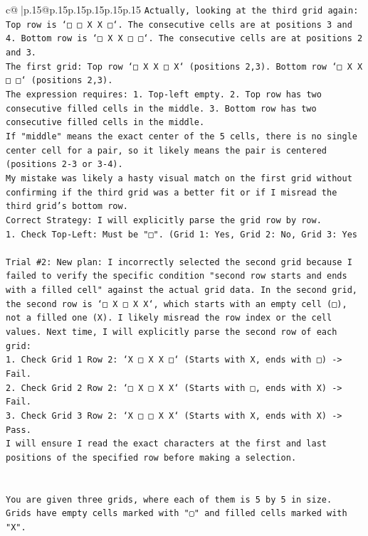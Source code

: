 \documentclass{article}
\begin{document}
{\begin{supertabular}{c@{$\;$}|p{.15\linewidth}@{}p{.15\linewidth}p{.15\linewidth}p{.15\linewidth}p{.15\linewidth}p{.15\linewidth}}
{{{\texttt{Actually, looking at the third grid again: Top row is `□ □ X X □`. The consecutive cells are at positions 3 and 4. Bottom row is `□ X X □ □`. The consecutive cells are at positions 2 and 3.} \\
\texttt{The first grid: Top row `□ X X □ X` (positions 2,3). Bottom row `□ X X □ □` (positions 2,3).} \\
\texttt{The expression requires: 1. Top{-}left empty. 2. Top row has two consecutive filled cells in the middle. 3. Bottom row has two consecutive filled cells in the middle.} \\
\texttt{If "middle" means the exact center of the 5 cells, there is no single center cell for a pair, so it likely means the pair is centered (positions 2{-}3 or 3{-}4).} \\
\texttt{My mistake was likely a hasty visual match on the first grid without confirming if the third grid was a better fit or if I misread the third grid's bottom row.} \\
\texttt{Correct Strategy: I will explicitly parse the grid row by row.} \\
\texttt{1. Check Top{-}Left: Must be "□". (Grid 1: Yes, Grid 2: No, Grid 3: Yes} \\
\\ 
\texttt{Trial \#2: New plan: I incorrectly selected the second grid because I failed to verify the specific condition "second row starts and ends with a filled cell" against the actual grid data. In the second grid, the second row is `□ X □ X X`, which starts with an empty cell (□), not a filled one (X). I likely misread the row index or the cell values. Next time, I will explicitly parse the second row of each grid:} \\
\texttt{1. Check Grid 1 Row 2: `X □ X X □` (Starts with X, ends with □) {-}> Fail.} \\
\texttt{2. Check Grid 2 Row 2: `□ X □ X X` (Starts with □, ends with X) {-}> Fail.} \\
\texttt{3. Check Grid 3 Row 2: `X □ □ X X` (Starts with X, ends with X) {-}> Pass.} \\
\texttt{I will ensure I read the exact characters at the first and last positions of the specified row before making a selection.} \\
\\ 
\\ 
\texttt{You are given three grids, where each of them is 5 by 5 in size.} \\
\texttt{Grids have empty cells marked with "▢" and filled cells marked with "X".} \\
}}}
\end{supertabular}}
\end{document}
